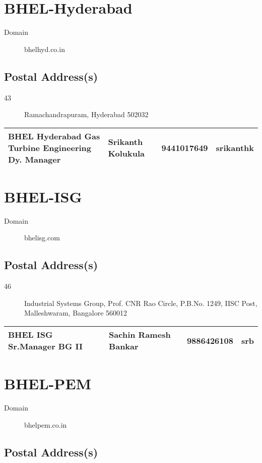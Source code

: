 \documentclass[a4paper, 11pt, twoside]{book}
\begin{document}
\section{BHEL-Hyderabad}\label{com:32}
\begin{description}
\item[Domain]bhelhyd.co.in
\end{description}
\subsection*{Postal Address(s)}
\begin{description}
\item [43]Ramachandrapuram, Hyderabad 502032
\end{description}
\begin{tabular}{|p{4cm}|p{2cm}|p{2cm}|p{3cm}|}
\hline
BHEL Hyderabad Gas Turbine Engineering Dy. Manager & Srikanth Kolukula & 9441017649 & srikanthk \\ \hline
\end{tabular}
\section{BHEL-ISG}\label{com:34}
\begin{description}
\item[Domain]bhelisg.com
\end{description}
\subsection*{Postal Address(s)}
\begin{description}
\item [46]Industrial Systems Group, Prof. CNR Rao Circle, P.B.No. 1249, IISC Post, Malleshwaram, Bangalore 560012
\end{description}
\begin{tabular}{|p{4cm}|p{2cm}|p{2cm}|p{3cm}|}
\hline
BHEL ISG Sr.Manager BG II & Sachin Ramesh Bankar & 9886426108 & srb \\ \hline
\end{tabular}
\section{BHEL-PEM}\label{com:20}
\begin{description}
\item[Domain]bhelpem.co.in
\end{description}
\subsection*{Postal Address(s)}
\end{document}
